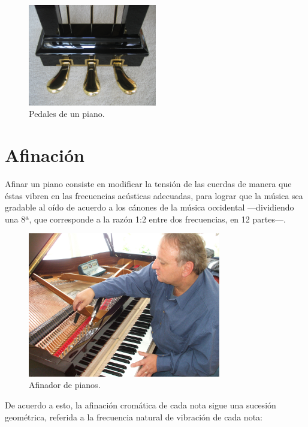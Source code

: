\documentclass[10pt,a4paper]{article}
\begin{document}
	\begin{figure}[!ht]
		\centering
		\includegraphics[width=0.5\textwidth]{images/pedals}
		\caption[Pedales de un piano]{\label{fig:pedals} Pedales de un piano. \cite{pedals}}
	\end{figure}
	
	
	\clearpage
	\section{Afinación}
	
	Afinar un piano consiste en modificar la tensión de las cuerdas de manera 
	que éstas vibren en las frecuencias acústicas adecuadas, para lograr que la 
	música sea gradable al oído de acuerdo a los cánones de la música 
	occidental ---dividiendo una 8ª, que corresponde a la razón 1:2 entre dos 
	frecuencias, en 12 partes---.
	
	\begin{figure}[!ht]
		\centering
		\includegraphics[width=0.75\textwidth]{images/tuner}
		\caption[Afinador de pianos]{\label{fig:tuner} Afinador de pianos. \cite{tuner}}
	\end{figure}
	
	De acuerdo a esto, la afinación cromática de cada nota sigue una sucesión 
	geométrica, referida a la frecuencia natural de vibración de cada nota:
	
\end{document}
